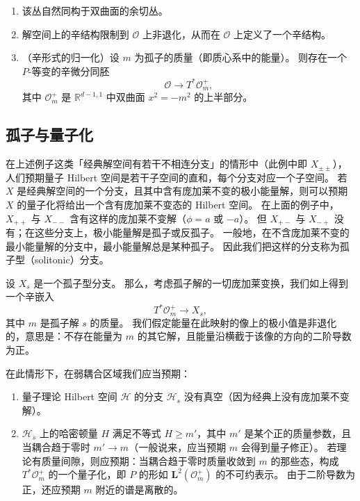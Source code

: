 
\begin{enumerate}
\item 该丛自然同构于双曲面的余切丛。
\item 解空间上的辛结构限制到 $\mathcal{O}$ 上非退化，从而在 $\mathcal{O}$ 上定义了一个辛结构。
\item （辛形式的归一化）设 $m$ 为孤子的质量（即质心系中的能量）。
  则存在一个 $P$-等变的辛微分同胚
  \[
  \mathcal{O}\to T^*\mathcal{O}^+_m,
  \]
  其中 $\mathcal{O}^+_m$ 是 $\mathbb{R}^{d-1,1}$ 中双曲面 $x^2=-m^2$ 的上半部分。
\end{enumerate}

\subsection{孤子与量子化}

在上述例子这类「经典解空间有若干不相连分支」的情形中（此例中即 $X_{\pm\pm}$），人们预期量子 Hilbert 空间是若干子空间的直和，每个分支对应一个子空间。
若 $X$ 是经典解空间的一个分支，且其中含有庞加莱不变的极小能量解，则可以预期 $X$ 的量子化将给出一个含有庞加莱不变态的 Hilbert 空间。
在上面的例子中，$X_{++}$ 与 $X_{--}$ 含有这样的庞加莱不变解（$\phi=a$ 或 $-a$）。
但 $X_{+-}$ 与 $X_{-+}$ 没有；在这些分支上，极小能量解是孤子或反孤子。
一般地，在不含庞加莱不变的最小能量解的分支中，最小能量解总是某种孤子。
因此我们把这样的分支称为孤子型（solitonic）分支。

设 $X_s$ 是一个孤子型分支。
那么，考虑孤子解的一切庞加莱变换，我们如上得到一个辛嵌入
\[
T^*\mathcal{O}^+_m\to X_s,
\]
其中 $m$ 是孤子解 $s$ 的质量。
我们假定能量在此映射的像上的极小值是非退化的，意思是：不存在能量为 $m$ 的其它解，且能量沿横截于该像的方向的二阶导数为正。

在此情形下，在弱耦合区域我们应当预期：

\begin{enumerate}
\item 量子理论 Hilbert 空间 $\mathcal{H}$ 的分支 $\mathcal{H}_s$ 没有真空（因为经典上没有庞加莱不变解）。
\item $\mathcal{H}_s$ 上的哈密顿量 $H$ 满足不等式 $H\ge m'$，其中 $m'$ 是某个正的质量参数，且当耦合趋于零时 $m'\to m$（一般说来，应当预期 $m$ 会得到量子修正）。
  若理论有质量间隙，则应预期：当耦合趋于零时质量收敛到 $m$ 的那些态，构成 $T^*\mathcal{O}^+_m$ 的一个量子化，即 $P$ 的形如 $\mathbf{L}^2(\mathcal{O}^+_m)$ 的不可约表示。
  由于二阶导数为正，还应预期 $m$ 附近的谱是离散的。
\end{enumerate}

